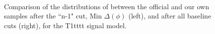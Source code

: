 \begin{figure}
        \centering
        \hspace{-1 cm}
        ~ %
        \caption{Comparison of the distributions of \MHT between the official and our own samples after the ``n-1" cut, Min $\Delta(\phi)$ (left), and after all baseline cuts (right), for the T1tttt signal model.}\label{fig:animals}
\end{figure}        
        
